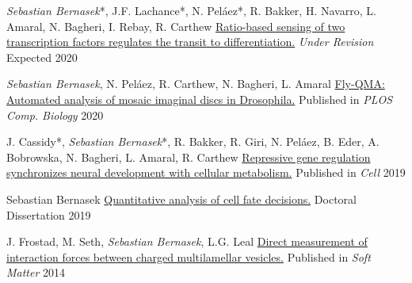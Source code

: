 

\begin{cventries}


  \cventrypub
    {\emph{Sebastian Bernasek}*, J.F. Lachance*, N. Pel\'{a}ez*, R. Bakker, H. Navarro, L. Amaral, N. Bagheri, I. Rebay, R. Carthew}
    {\href{https://doi.org/10.1101/430744}{Ratio-based sensing of two transcription factors regulates the transit to differentiation.}}
    {\emph{Under Revision}}
    {Expected 2020}   
  
  \cventrypub
    {\emph{Sebastian Bernasek}, N. Pel\'{a}ez, R. Carthew, N. Bagheri, L. Amaral}
    {\href{ https://doi.org/10.1371/journal.pcbi.1007406}{Fly-QMA: Automated analysis of mosaic imaginal discs in Drosophila.}}
    {Published in \emph{PLOS Comp. Biology}}
    {2020}  
  
  \cventrypub
    {J. Cassidy*, \emph{Sebastian Bernasek}*, R. Bakker, R. Giri, N. Pel\'{a}ez, B. Eder, A. Bobrowska, N. Bagheri, L. Amaral, R. Carthew}
    {\href{https://doi.org/10.1016/j.cell.2019.06.023}{Repressive gene regulation synchronizes neural development with cellular metabolism.}}
    {Published in \emph{Cell}}
    {2019}
    
  \cventrypub
    {Sebastian Bernasek}
    {\href{https://github.com/sebastianbernasek/dissertation/blob/master/thesis.pdf}{Quantitative analysis of cell fate decisions.}}
    {Doctoral Dissertation}
    {2019}
  
  \cventrypub
    {J. Frostad, M. Seth, \emph{Sebastian Bernasek}, L.G. Leal}
    {\href{https://www.ncbi.nlm.nih.gov/pubmed/25141827}{Direct measurement of interaction forces between charged multilamellar vesicles.}}
    {Published in \emph{Soft Matter}}
    {2014} 
    

\end{cventries}
